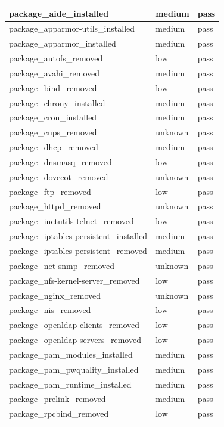 \begin{longtable}{|p{10cm}|p{2cm}|p{2cm}|}
\hline
package\_aide\_installed & medium & pass \\
\hline
package\_apparmor-utils\_installed & medium & pass \\
\hline
package\_apparmor\_installed & medium & pass \\
\hline
package\_autofs\_removed & low & pass \\
\hline
package\_avahi\_removed & medium & pass \\
\hline
package\_bind\_removed & low & pass \\
\hline
package\_chrony\_installed & medium & pass \\
\hline
package\_cron\_installed & medium & pass \\
\hline
package\_cups\_removed & unknown & pass \\
\hline
package\_dhcp\_removed & medium & pass \\
\hline
package\_dnsmasq\_removed & low & pass \\
\hline
package\_dovecot\_removed & unknown & pass \\
\hline
package\_ftp\_removed & low & pass \\
\hline
package\_httpd\_removed & unknown & pass \\
\hline
package\_inetutils-telnet\_removed & low & pass \\
\hline
package\_iptables-persistent\_installed & medium & pass \\
\hline
package\_iptables-persistent\_removed & medium & pass \\
\hline
package\_net-snmp\_removed & unknown & pass \\
\hline
package\_nfs-kernel-server\_removed & low & pass \\
\hline
package\_nginx\_removed & unknown & pass \\
\hline
package\_nis\_removed & low & pass \\
\hline
package\_openldap-clients\_removed & low & pass \\
\hline
package\_openldap-servers\_removed & low & pass \\
\hline
package\_pam\_modules\_installed & medium & pass \\
\hline
package\_pam\_pwquality\_installed & medium & pass \\
\hline
package\_pam\_runtime\_installed & medium & pass \\
\hline
package\_prelink\_removed & medium & pass \\
\hline
package\_rpcbind\_removed & low & pass \\

\end{longtable}
